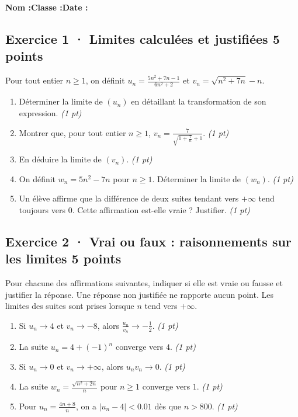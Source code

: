 \smallskip\textbf{Nom :}\enspace\dotfill\quad\textbf{Classe :}\enspace\dotfill\quad\textbf{Date :}\enspace\dotfill

\subsection*{Exercice 1 · Limites calculées et justifiées \hfill 5 points}Pour tout entier $n\ge1$, on définit $u_n=\frac{5n^2+7n-1}{6n^2+2}$ et $v_n=\sqrt{n^2+7n}-n$.

\begin{enumerate}

\item Déterminer la limite de $(u_n)$ en détaillant la transformation de son expression. \hfill\textit{(1 pt)}

\item Montrer que, pour tout entier $n\ge1$, $v_n=\frac{7}{\sqrt{1+\frac{7}n}+1}$. \hfill\textit{(1 pt)}

\item En déduire la limite de $(v_n)$. \hfill\textit{(1 pt)}

\item On définit $w_n=5n^2-7n$ pour $n\ge1$. Déterminer la limite de $(w_n)$. \hfill\textit{(1 pt)}

\item Un élève affirme que la différence de deux suites tendant vers $+\infty$ tend toujours vers $0$. Cette affirmation est-elle vraie ? Justifier. \hfill\textit{(1 pt)}

\end{enumerate}

\subsection*{Exercice 2 · Vrai ou faux : raisonnements sur les limites \hfill 5 points}Pour chacune des affirmations suivantes, indiquer si elle est vraie ou fausse et justifier la réponse. Une réponse non justifiée ne rapporte aucun point. Les limites des suites sont prises lorsque $n$ tend vers $+\infty$.

\begin{enumerate}

\item Si $u_n\to 4$ et $v_n\to-8$, alors $\frac{u_n}{v_n}\to-\frac{1}{2}$. \hfill\textit{(1 pt)}

\item La suite $u_n=4+(-1)^n$ converge vers $4$. \hfill\textit{(1 pt)}

\item Si $u_n\to0$ et $v_n\to+\infty$, alors $u_nv_n\to0$. \hfill\textit{(1 pt)}

\item La suite $w_n=\frac{\sqrt{n^2+2n}}{n}$ pour $n\ge1$ converge vers $1$. \hfill\textit{(1 pt)}

\item Pour $u_n=\frac{4n+8}{n}$, on a $|u_n-4|<\num{0,01}$ dès que $n> 800$. \hfill\textit{(1 pt)}

\end{enumerate}

